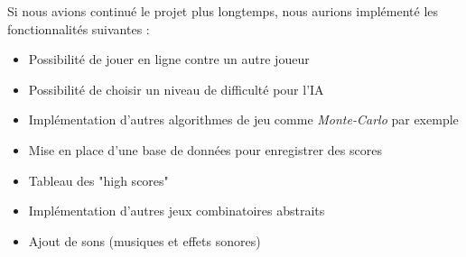 Si nous avions continué le projet plus longtemps, nous aurions implémenté les fonctionnalités suivantes :

\begin{itemize}
    \item Possibilité de jouer en ligne contre un autre joueur
    \item Possibilité de choisir un niveau de difficulté pour l'IA
    \item Implémentation d'autres algorithmes de jeu comme \emph{Monte-Carlo} par exemple
    \item Mise en place d'une base de données pour enregistrer des scores
    \item Tableau des "high scores"
    \item Implémentation d'autres jeux combinatoires abstraits
    \item Ajout de sons (musiques et effets sonores)
\end{itemize}